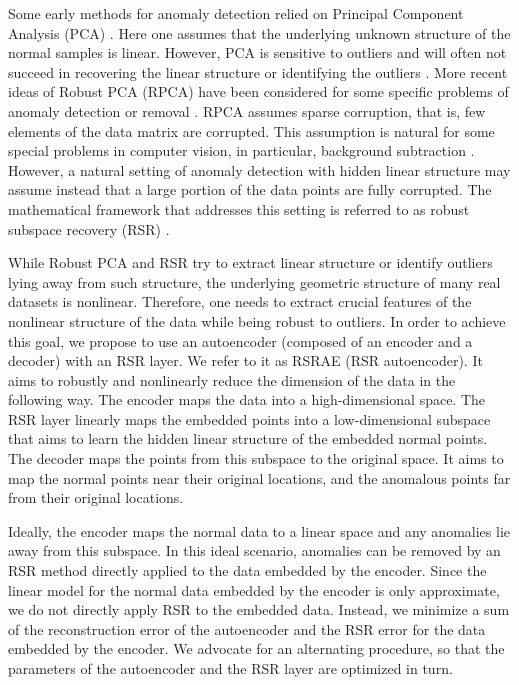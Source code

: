 \documentclass{article} \usepackage{iclr2020_conference,times}
\begin{document}
Some early methods for anomaly detection relied on Principal Component Analysis (PCA) \citep{shyu2003novelnew}. Here one assumes that the underlying unknown structure of the normal samples is linear. However, PCA is sensitive to outliers and will often not succeed in recovering the linear structure or identifying the outliers \citep{lerman2018overview,vaswani2018static}. More recent ideas of Robust PCA (RPCA) \citep{wright2009robust,vaswani2018static} have been considered for some specific problems of anomaly detection or removal \citep{zhou2017anomaly, paffenroth2018robust}. RPCA assumes sparse corruption, that is, few elements of the data matrix are corrupted. This assumption is natural for some special problems in computer vision, in particular, background subtraction \citep{Torre:03, wright2009robust,vaswani2018static}. However, a natural setting of anomaly detection with hidden linear structure may assume instead that a large portion of the data points are fully corrupted. The mathematical framework that addresses this setting is referred to as robust subspace recovery (RSR) \citep{lerman2018overview}.


While Robust PCA and RSR try to extract linear structure or identify outliers lying away from such structure, the underlying geometric structure of many real datasets is nonlinear. Therefore, one needs to extract crucial features of the nonlinear structure of the data while being robust to outliers. In order to achieve this goal, we propose to use an autoencoder (composed of an encoder and a decoder) with an RSR layer. We refer to it as RSRAE (RSR autoencoder).
It aims to robustly and nonlinearly reduce the dimension of the data in the following way. The encoder maps the data into a high-dimensional space. The RSR layer linearly maps 
the embedded points into a low-dimensional subspace that aims to learn the hidden linear structure of the embedded normal points. The decoder maps the points from this subspace to the original space. It aims to map the normal points near their original locations, and the anomalous points far from their original locations.

Ideally, the encoder maps the normal data to a linear space and any anomalies lie away from this subspace. In this ideal scenario, anomalies can be removed by an RSR method directly applied to the data embedded by the encoder. Since the linear model for the normal data embedded by the encoder is only approximate, we do not directly apply RSR to the embedded data. Instead, we  minimize a sum of the reconstruction error of the autoencoder and the RSR error for the data embedded by the encoder. We advocate for an alternating procedure, so that the parameters of the autoencoder and the RSR layer are optimized in turn.
\end{document}
